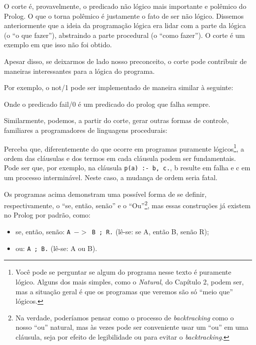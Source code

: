 \documentclass{article}
\theoremstyle{remark}
\begin{document}
O corte é, provavelmente, o predicado não lógico mais importante e polêmico do Prolog. O que o torna polêmico é justamente o fato de ser não lógico. Dissemos anteriormente que a ideia da programação lógica era lidar com a parte da lógica (o ``o que fazer''), abstraindo a parte procedural (o ``como fazer''). O corte é um exemplo em que isso não foi obtido.

Apesar disso, se deixarmos de lado nosso preconceito, o corte pode contribuir de maneiras interessantes para a lógica do programa.

Por exemplo, o not/1 pode ser implementado de maneira similar à seguinte:



Onde o predicado fail/0 é um predicado do prolog que falha sempre.

Similarmente, podemos, a partir do corte, gerar outras formas de controle, familiares a programadores de linguagens procedurais:





Perceba que, diferentemente do que ocorre em programas puramente lógicos\footnote{Você pode se perguntar se algum do programa nesse texto é puramente lógico. Alguns dos mais simples, como o \textit{Natural}, do Capítulo 2, %
podem ser, mas a situação geral é que os programas que veremos são só ``meio que'' lógicos.}, a ordem das cláusulas e dos termos em cada cláusula podem ser fundamentais. Pode ser que, por exemplo, na cláusula {\tt p(a) :- b, c.}, b resulte em falha e c em um
processo interminável. Neste caso, a mudança de ordem seria fatal.

Os programas acima demonstram uma possível forma de se definir, respectivamente, o ``se, então, senão'' e o ``Ou''\footnote{Na verdade, poderíamos pensar como o processo de \textit{backtracking} como o nosso ``ou'' natural, mas às vezes pode ser conveniente usar um ``ou'' em uma cláusula, seja por efeito de legibilidade ou para evitar o \textit{backtracking}.}, mas essas construções já existem no Prolog por padrão, como:

\begin{itemize}
  \item se, então, senão: {\tt A $->$ B ; R.} (lê-se: se A, então B, senão R);
  \item ou: {\tt A ; B.} (lê-se: A ou B).
\end{itemize}


  \begin{thebibliography}{2}


  \end{thebibliography}
\end{document}
